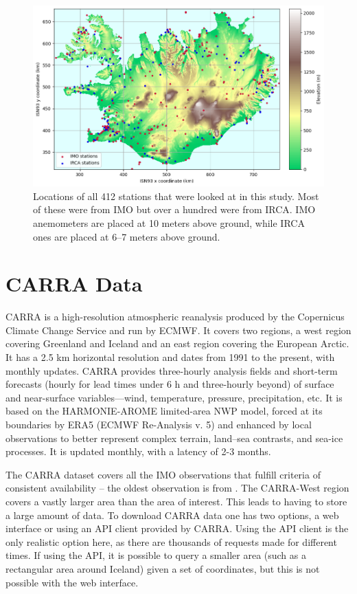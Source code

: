 \begin{figure}
    \centering
    \includegraphics[scale = 1]{Figures/station_elevations.png}
    \caption[Locations of automatic weather stations in Iceland]{Locations of all 412 stations that were looked at in this study. Most of these were from IMO but over a hundred were from IRCA. IMO anemometers are placed at 10 meters above ground, while IRCA ones are placed at 6--7 meters above ground.}
    \label{fig:aws_map}
\end{figure}

\section{CARRA Data}
CARRA is a high-resolution atmospheric reanalysis produced by the Copernicus Climate Change Service and run by ECMWF. It covers two regions, a west region covering Greenland and Iceland and an east region covering the European Arctic. It has a 2.5 km horizontal resolution and dates from 1991 to the present, with monthly updates. CARRA provides three-hourly analysis fields and short-term forecasts (hourly for lead times under 6 h and three-hourly beyond) of surface and near-surface variables—wind, temperature, pressure, precipitation, etc. It is based on the HARMONIE-AROME limited-area NWP model, forced at its boundaries by ERA5 (ECMWF Re-Analysis v. 5) and enhanced by local observations to better represent complex terrain, land–sea contrasts, and sea-ice processes. It is updated monthly, with a latency of 2-3 months\cite{carra_information}.

The CARRA dataset covers all the IMO observations that fulfill criteria of consistent availability – the oldest observation is from \startDateVedur. The CARRA-West region covers a vastly larger area than the area of interest. This leads to having to store a large amount of data. To download CARRA data one has two options, a web interface or using an API client provided by CARRA. Using the API client is the only realistic option here, as there are thousands of requests made for different times. If using the API, it is possible to query a smaller area (such as a rectangular area around Iceland) given a set of coordinates, but this is not possible with the web interface.

